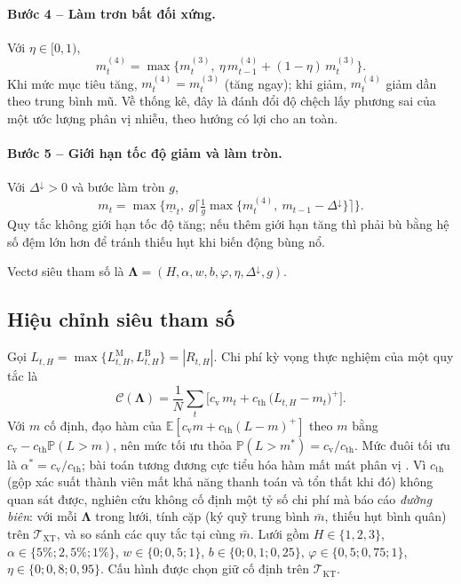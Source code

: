 \documentclass[12pt,a4paper]{article}
\theoremstyle{definition}
\theoremstyle{remark}
\newcommand{\E}{\mathbb{E}}
\newcommand{\Prob}{\mathbb{P}}
\newcommand{\bLambda}{\boldsymbol{\Lambda}}
\begin{document}
\paragraph{Bước 4 -- Làm trơn bất đối xứng.} Với $\eta\in[0,1)$,
\begin{equation}
m^{(4)}_t=\max\big\{m^{(3)}_t,\ \eta\,m^{(4)}_{t-1}+(1-\eta)\,m^{(3)}_t\big\}.
\end{equation}
Khi mức mục tiêu tăng, $m^{(4)}_t=m^{(3)}_t$ (tăng ngay); khi giảm, $m^{(4)}_t$ giảm dần theo trung bình mũ. Về thống kê, đây là đánh đổi độ chệch lấy phương sai của một ước lượng phân vị nhiễu, theo hướng có lợi cho an toàn.
\paragraph{Bước 5 -- Giới hạn tốc độ giảm và làm tròn.} Với $\Delta^{\downarrow}>0$ và bước làm tròn $g$,
\begin{equation}
m_t=\max\Big\{\underline{m}_t,\ g\Big\lceil\tfrac{1}{g}\max\{m^{(4)}_t,\ m_{t-1}-\Delta^{\downarrow}\}\Big\rceil\Big\}.
\end{equation}
Quy tắc không giới hạn tốc độ tăng; nếu thêm giới hạn tăng thì phải bù bằng hệ số đệm lớn hơn để tránh thiếu hụt khi biến động bùng nổ.

Vectơ siêu tham số là $\bLambda=(H,\alpha,w,b,\varphi,\eta,\Delta^{\downarrow},g)$.

\subsection{Hiệu chỉnh siêu tham số}

Gọi $L_{t,H}=\max\{L^{\mathrm M}_{t,H},L^{\mathrm B}_{t,H}\}=|R_{t,H}|$. Chi phí kỳ vọng thực nghiệm của một quy tắc là
\begin{equation}
\mathcal C(\bLambda)=\frac1N\sum_{t}\Big[c_{\mathrm v}\,m_t+c_{\mathrm{th}}\,\big(L_{t,H}-m_t\big)^{+}\Big].
\end{equation}
Với $m$ cố định, đạo hàm của $\E[c_{\mathrm v}m+c_{\mathrm{th}}(L-m)^+]$ theo $m$ bằng $c_{\mathrm v}-c_{\mathrm{th}}\Prob(L>m)$, nên mức tối ưu thỏa $\Prob(L>m^\ast)=c_{\mathrm v}/c_{\mathrm{th}}$. Mức đuôi tối ưu là $\alpha^\ast=c_{\mathrm v}/c_{\mathrm{th}}$; bài toán tương đương cực tiểu hóa hàm mất mát phân vị \cite{koenker1978}. Vì $c_{\mathrm{th}}$ (gộp xác suất thành viên mất khả năng thanh toán và tổn thất khi đó) không quan sát được, nghiên cứu không cố định một tỷ số chi phí mà báo cáo \emph{đường biên}: với mỗi $\bLambda$ trong lưới, tính cặp (ký quỹ trung bình $\bar m$, thiếu hụt bình quân) trên $\mathcal T_{\mathrm{XT}}$, và so sánh các quy tắc tại cùng $\bar m$. Lưới gồm $H\in\{1,2,3\}$, $\alpha\in\{5\%;2{,}5\%;1\%\}$, $w\in\{0;0{,}5;1\}$, $b\in\{0;0{,}1;0{,}25\}$, $\varphi\in\{0{,}5;0{,}75;1\}$, $\eta\in\{0;0{,}8;0{,}95\}$. Cấu hình được chọn giữ cố định trên $\mathcal T_{\mathrm{KT}}$.
\end{document}
